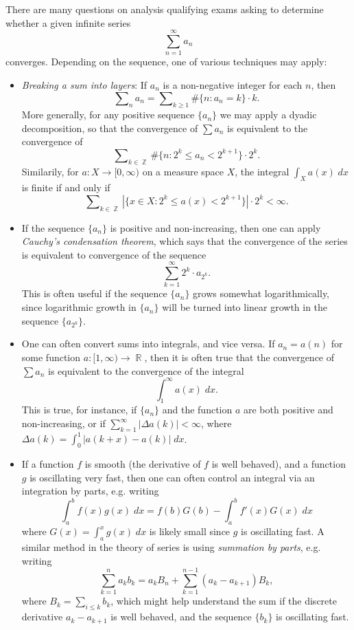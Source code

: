 \documentclass[answers]{exam}
\DeclareMathOperator{\RR}{\mathbb{R}}
\DeclareMathOperator{\ZZ}{\mathbb{Z}}
\begin{document}
There are many questions on analysis qualifying exams asking to determine whether a given infinite series
%
\[ \sum_{n = 1}^\infty a_n \]
%
converges. Depending on the sequence, one of various techniques may apply:
%
\begin{itemize}
	\item \emph{Breaking a sum into layers}: If $a_n$ is a non-negative integer for each $n$, then
	\[ \sum\nolimits_n a_n = \sum\nolimits_{k \geq 1} \# \{ n : a_n = k \} \cdot k. \]
	More generally, for any positive sequence $\{ a_n \}$ we may apply a dyadic decomposition, so that the convergence of $\sum a_n$ is equivalent to the convergence of
	\[ \sum\nolimits_{k \in \ZZ} \# \{ n : 2^k \leq a_n < 2^{k+1} \} \cdot 2^k. \]
	Similarily, for $a: X \to [0,\infty)$ on a measure space $X$, the integral $\int_X a(x)\; dx$ is finite if and only if
	\[ \sum\nolimits_{k \in \ZZ} |\{ x \in X: 2^k \leq a(x) < 2^{k+1} \}| \cdot 2^k < \infty. \]

	\item If the sequence $\{ a_n \}$ is positive and non-increasing, then one can apply \emph{Cauchy's condensation theorem}, which says that the convergence of the series is equivalent to convergence of the sequence
	\[ \sum_{k = 1}^\infty 2^k \cdot a_{2^k}. \]
	This is often useful if the sequence $\{ a_n \}$ grows somewhat logarithmically, since logarithmic growth in $\{ a_n \}$ will be turned into linear growth in the sequence $\{ a_{2^k} \}$.

	\item One can often convert sums into integrals, and vice versa. If $a_n = a(n)$ for some function $a: [1,\infty) \to \RR$, then it is often true that the convergence of $\sum a_n$ is equivalent to the convergence of the integral
	\[ \int_1^\infty a(x)\; dx. \]
	This is true, for instance, if $\{ a_n \}$ and the function $a$ are both positive and non-increasing,  or if $\sum_{k = 1}^\infty |\Delta a(k)| < \infty$, where $\Delta a(k) = \int_0^1 |a(k+x) - a(k)|\; dx$.

	\item If a function $f$ is smooth (the derivative of $f$ is well behaved), and a function $g$ is oscillating very fast, then one can often control an integral via an integration by parts, e.g. writing
	\[ \int_a^b f(x) g(x)\; dx = f(b) G(b) - \int_a^b f'(x) G(x)\; dx \]
	where $G(x) = \int_a^x g(x)\; dx$ is likely small since $g$ is oscillating fast. A similar method in the theory of series is using \emph{summation by parts}, e.g. writing
	\[ \sum_{k = 1}^n a_k b_k = a_k B_n + \sum_{k = 1}^{n-1} (a_k - a_{k+1}) B_k, \]
	where $B_k = \sum_{i \leq k} b_k$, which might help understand the sum if the discrete derivative $a_k - a_{k+1}$ is well behaved, and the sequence $\{ b_k \}$ is oscillating fast.


\end{itemize}
\end{document}
